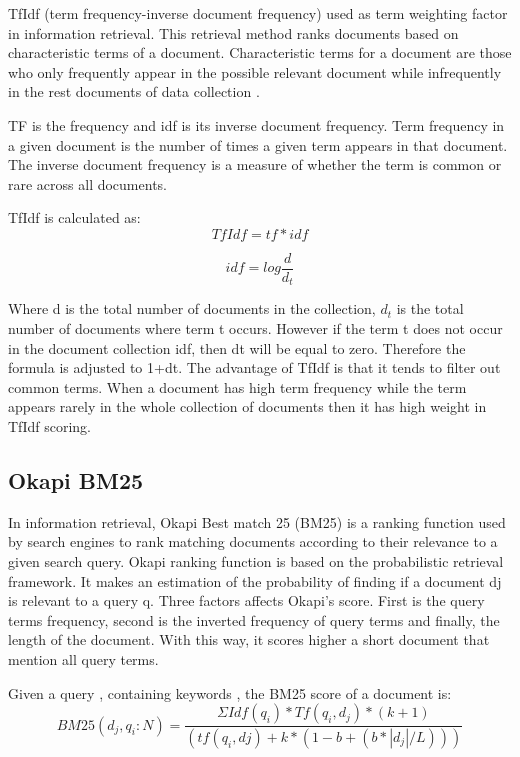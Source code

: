 TfIdf (term frequency-inverse document frequency) used as term weighting factor in information retrieval. This retrieval method ranks documents based on characteristic terms of a document. Characteristic terms for a document are those who only frequently appear in the possible relevant document while infrequently in the rest documents of data collection \cite{ShouningSujuanYan}.

TF is the frequency and idf is its inverse document frequency. Term frequency in a given document is the number of times a given term appears in that document. The inverse document frequency is a measure of whether the term is common or rare across all documents.

TfIdf  is calculated as:
\begin{equation}
	TfIdf = tf * idf
\end{equation}

\begin{equation}
	idf = log \frac{ d }{ d_t}
\end{equation}

Where d is the total number of documents in the collection, $d_t$ is the  total number of documents where term t occurs. However if the term t does not occur in the document collection idf, then dt will be equal to zero. Therefore the formula is adjusted to 1+dt. The advantage of TfIdf is that it tends to filter out common terms. When a document has high term frequency while the term appears rarely in the whole collection of documents then it has high weight in TfIdf scoring.


\subsection{Okapi BM25}

In information retrieval, Okapi Best match 25 (BM25)  is a ranking function used by search engines to rank matching documents according to their relevance to a given search query. Okapi ranking function is based on the probabilistic retrieval framework. It makes an estimation of the probability of finding if a document dj is relevant to a query q. Three factors affects Okapi's score. First is the query terms frequency, second is the inverted frequency of query terms and finally, the length of the document. With this way, it scores higher a short document that mention all query terms.

Given a query , containing keywords , the BM25 score of a document is:
\begin{equation}
BM25(d_j,q_i:N) = \frac{ ΣIdf(q_i)*Tf(q_i, d_j)*(k + 1) } { ( tf(q_i, dj)+k* (1-b+(b*|d_j|/L))) }
\end{equation}

